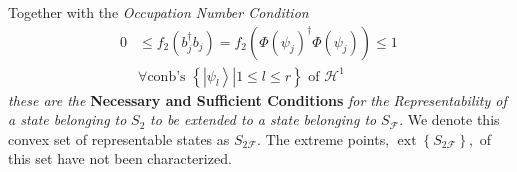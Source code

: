 \documentclass[aps,preprint]{revtex4}%
\begin{document}
Together with the \emph{Occupation Number Condition}
\begin{align}
0  &  \leq f_{2}\left(  b_{j}^{\dagger}b_{j}\right)  =f_{2}\left(  \Phi\left(
\psi_{j}\right)  ^{\dagger}\Phi\left(  \psi_{j}\right)  \right)
\leq1\,\nonumber\\
&  \forall\text{conb's }\left\{  \left.  \left\vert \psi_{l}\right\rangle
\right\vert 1\leq l\leq r\right\}  \text{ of }\mathcal{H}^{1} \label{SingOcc}%
\end{align}
\emph{these are the }\textbf{Necessary and Sufficient Conditions} \emph{for
the Representability of a state belonging to }$S_{2}$ \emph{to be extended to
a state belonging to }$S_{\mathcal{F}}.$ We denote this convex set of
representable states as $S_{2\mathcal{F}}.$ The extreme points,
$\operatorname*{ext}\left\{  S_{2\mathcal{F}}\right\}  ,$ of this set have not
been characterized.
\end{document}
